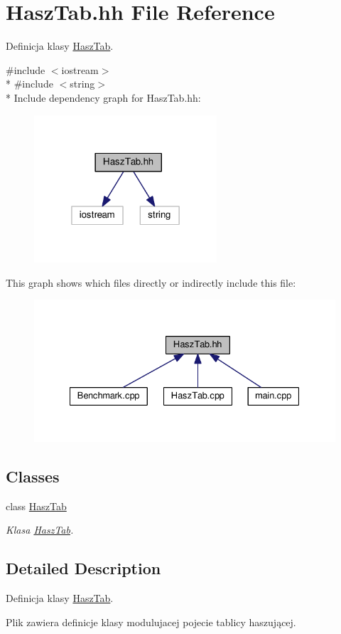 \hypertarget{a00012}{}\section{Hasz\+Tab.\+hh File Reference}
\label{a00012}


Definicja klasy \hyperlink{a00003}{Hasz\+Tab}.  


{\ttfamily \#include $<$iostream$>$}\\*
{\ttfamily \#include $<$string$>$}\\*
Include dependency graph for Hasz\+Tab.\+hh\+:\nopagebreak
\begin{figure}[H]
\begin{center}
\leavevmode
\includegraphics[width=193pt]{a00029}
\end{center}
\end{figure}
This graph shows which files directly or indirectly include this file\+:\nopagebreak
\begin{figure}[H]
\begin{center}
\leavevmode
\includegraphics[width=331pt]{a00030}
\end{center}
\end{figure}
\subsection*{Classes}
\begin{DoxyCompactItemize}
\item 
class \hyperlink{a00003}{Hasz\+Tab}
\begin{DoxyCompactList}\small\item\em Klasa \hyperlink{a00003}{Hasz\+Tab}. \end{DoxyCompactList}\end{DoxyCompactItemize}


\subsection{Detailed Description}
Definicja klasy \hyperlink{a00003}{Hasz\+Tab}. 

Plik zawiera definicje klasy modulujacej pojecie tablicy haszującej. 